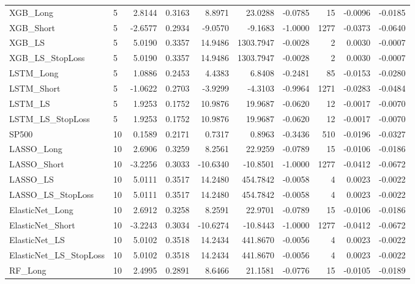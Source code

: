 \begin{tabular}{llrrrrrrrr}
\cline{1-10}
XGB\_Long & 5 & 2.8144 & 0.3163 & 8.8971 & 23.0288 & -0.0785 & 15 & -0.0096 & -0.0185 \\
\cline{1-10}
XGB\_Short & 5 & -2.6577 & 0.2934 & -9.0570 & -9.1683 & -1.0000 & 1277 & -0.0373 & -0.0640 \\
\cline{1-10}
XGB\_LS & 5 & 5.0190 & 0.3357 & 14.9486 & 1303.7947 & -0.0028 & 2 & 0.0030 & -0.0007 \\
\cline{1-10}
XGB\_LS\_StopLoss & 5 & 5.0190 & 0.3357 & 14.9486 & 1303.7947 & -0.0028 & 2 & 0.0030 & -0.0007 \\
\cline{1-10}
LSTM\_Long & 5 & 1.0886 & 0.2453 & 4.4383 & 6.8408 & -0.2481 & 85 & -0.0153 & -0.0280 \\
\cline{1-10}
LSTM\_Short & 5 & -1.0622 & 0.2703 & -3.9299 & -4.3103 & -0.9964 & 1271 & -0.0283 & -0.0484 \\
\cline{1-10}
LSTM\_LS & 5 & 1.9253 & 0.1752 & 10.9876 & 19.9687 & -0.0620 & 12 & -0.0017 & -0.0070 \\
\cline{1-10}
LSTM\_LS\_StopLoss & 5 & 1.9253 & 0.1752 & 10.9876 & 19.9687 & -0.0620 & 12 & -0.0017 & -0.0070 \\
\cline{1-10}
SP500 & 10 & 0.1589 & 0.2171 & 0.7317 & 0.8963 & -0.3436 & 510 & -0.0196 & -0.0327 \\
\cline{1-10}
LASSO\_Long & 10 & 2.6906 & 0.3259 & 8.2561 & 22.9259 & -0.0789 & 15 & -0.0106 & -0.0186 \\
\cline{1-10}
LASSO\_Short & 10 & -3.2256 & 0.3033 & -10.6340 & -10.8501 & -1.0000 & 1277 & -0.0412 & -0.0672 \\
\cline{1-10}
LASSO\_LS & 10 & 5.0111 & 0.3517 & 14.2480 & 454.7842 & -0.0058 & 4 & 0.0023 & -0.0022 \\
\cline{1-10}
LASSO\_LS\_StopLoss & 10 & 5.0111 & 0.3517 & 14.2480 & 454.7842 & -0.0058 & 4 & 0.0023 & -0.0022 \\
\cline{1-10}
ElasticNet\_Long & 10 & 2.6912 & 0.3258 & 8.2591 & 22.9701 & -0.0789 & 15 & -0.0106 & -0.0186 \\
\cline{1-10}
ElasticNet\_Short & 10 & -3.2243 & 0.3034 & -10.6274 & -10.8443 & -1.0000 & 1277 & -0.0412 & -0.0672 \\
\cline{1-10}
ElasticNet\_LS & 10 & 5.0102 & 0.3518 & 14.2434 & 441.8670 & -0.0056 & 4 & 0.0023 & -0.0022 \\
\cline{1-10}
ElasticNet\_LS\_StopLoss & 10 & 5.0102 & 0.3518 & 14.2434 & 441.8670 & -0.0056 & 4 & 0.0023 & -0.0022 \\
\cline{1-10}
RF\_Long & 10 & 2.4995 & 0.2891 & 8.6466 & 21.1581 & -0.0776 & 15 & -0.0105 & -0.0189 \\

\end{tabular}
